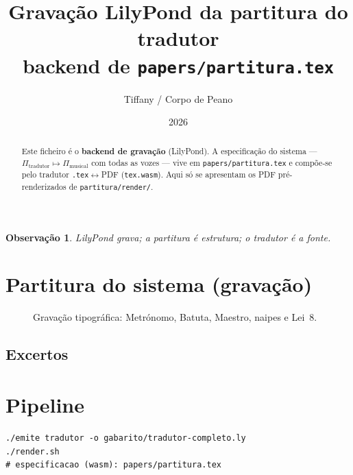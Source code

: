 \documentclass[11pt,a4paper]{article}
\title{Gravação LilyPond da partitura do tradutor\\
\large backend de \texttt{papers/partitura.tex}}
\author{Tiffany / Corpo de Peano}
\date{2026}
\newtheorem{observacao}{Observação}
\newcommand{\code}[1]{\texttt{#1}}
\begin{document}
\maketitle

\begin{abstract}
\noindent Este ficheiro é o \textbf{backend de gravação} (LilyPond). A
especificação do sistema --- $\Pi_{\mathrm{tradutor}}\mapsto\Pi_{\mathrm{musical}}$
com todas as vozes --- vive em \code{papers/partitura.tex} e compõe-se pelo
tradutor \texttt{.tex}$\leftrightarrow$PDF (\code{tex.wasm}). Aqui só se
apresentam os PDF pré-renderizados de \code{partitura/render/}.
\end{abstract}

\begin{observacao}
LilyPond grava; a partitura é estrutura; o tradutor é a fonte.
\end{observacao}

\section{Partitura do sistema (gravação)}

\begin{figure}[ht]
\centering
{}
\caption{Gravação tipográfica: Metrónomo, Batuta, Maestro, naipes e Lei~8.}
\end{figure}

\subsection*{Excertos}

\section{Pipeline}
\begin{verbatim}
./emite tradutor -o gabarito/tradutor-completo.ly
./render.sh
# especificacao (wasm): papers/partitura.tex
\end{verbatim}
\end{document}
